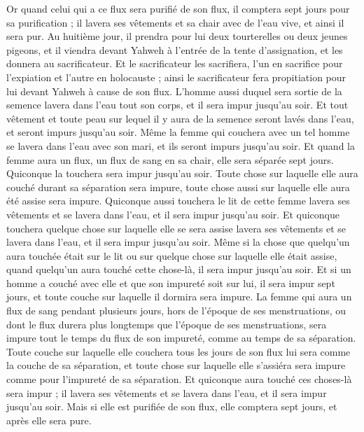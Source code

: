 \begin{multicols}{2}
Or quand celui qui a ce flux sera purifié de son flux, il comptera sept jours pour sa purification ; il lavera ses vêtements et sa chair avec de l'eau vive, et ainsi il sera pur.
Au huitième jour, il prendra pour lui deux tourterelles ou deux jeunes pigeons, et il viendra devant Yahweh à l'entrée de la tente d'assignation, et les donnera au sacrificateur.
Et le sacrificateur les sacrifiera, l'un en sacrifice pour l'expiation et l'autre en holocauste ; ainsi le sacrificateur fera propitiation pour lui devant Yahweh à cause de son flux.
L'homme aussi duquel sera sortie de la semence lavera dans l'eau tout son corps, et il sera impur jusqu'au soir.
Et tout vêtement et toute peau sur lequel il y aura de la semence seront lavés dans l'eau, et seront impurs jusqu'au soir.
Même la femme qui couchera avec un tel homme se lavera dans l'eau avec son mari, et ils seront impurs jusqu'au soir.
Et quand la femme aura un flux, un flux de sang en sa chair, elle sera séparée sept jours. Quiconque la touchera sera impur jusqu'au soir.
Toute chose sur laquelle elle aura couché durant sa séparation sera impure, toute chose aussi sur laquelle elle aura été assise sera impure.
Quiconque aussi touchera le lit de cette femme lavera ses vêtements et se lavera dans l'eau, et il sera impur jusqu'au soir.
Et quiconque touchera quelque chose sur laquelle elle se sera assise lavera ses vêtements et se lavera dans l'eau, et il sera impur jusqu'au soir.
Même si la chose que quelqu'un aura touchée était sur le lit ou sur quelque chose sur laquelle elle était assise, quand quelqu'un aura touché cette chose-là, il sera impur jusqu'au soir.
Et si un homme a couché avec elle et que son impureté soit sur lui, il sera impur sept jours, et toute couche sur laquelle il dormira sera impure.
La femme qui aura un flux de sang pendant plusieurs jours, hors de l'époque de ses menstruations, ou dont le flux durera plus longtemps que l'époque de ses menstruations, sera impure tout le temps du flux de son impureté, comme au temps de sa séparation.
Toute couche sur laquelle elle couchera tous les jours de son flux lui sera comme la couche de sa séparation, et toute chose sur laquelle elle s'assiéra sera impure comme pour l'impureté de sa séparation.
Et quiconque aura touché ces choses-là sera impur ; il lavera ses vêtements et se lavera dans l'eau, et il sera impur jusqu'au soir.
Mais si elle est purifiée de son flux, elle comptera sept jours, et après elle sera pure.

\end{multicols}
